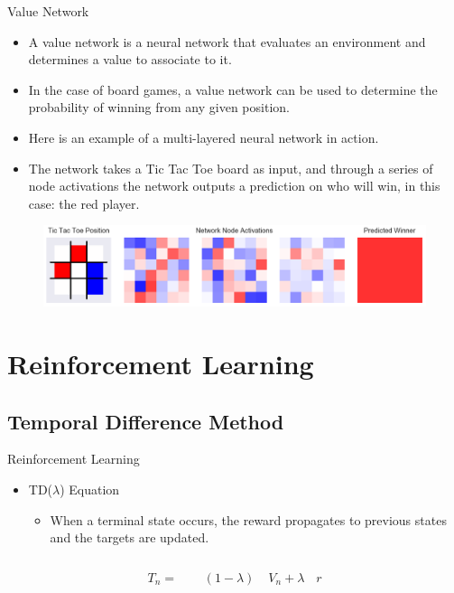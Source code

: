 \begin{frame}{Value Network}
\begin{itemize}
\item A value network is a neural network that evaluates an environment and determines a value to associate to it.
\item In the case of board games, a value network can be used to determine the probability of winning from any given position.
\item Here is an example of a multi-layered neural network in action.
\item The network takes a Tic Tac Toe board as input, and through a series of node activations the network outputs a prediction on who will win, in this case: the red player.
\end{itemize}
\begin{figure}
\includegraphics[width=1. \textwidth]{network_weights}
\end{figure}
\end{frame}

\section{Reinforcement Learning}
\subsection{Temporal Difference Method}
\begin{frame}{Reinforcement Learning}
\begin{itemize}
\item TD($\lambda$) Equation
\begin{itemize}
\item When a terminal state occurs, the reward propagates to previous states and the targets are updated.
\end{itemize}
\end{itemize}
\begin{equation*}
T_n = \phantom{\sum_{n=0}^{N_0} }(1-\lambda)\phantom{\lambda^n} V_n + \lambda^{\phantom{N_0}} r
\end{equation*}
\end{frame}

